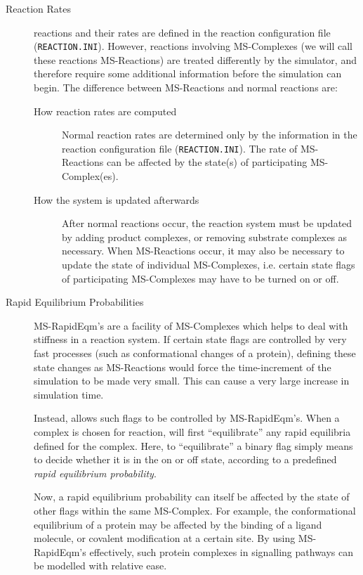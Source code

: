 \begin{description}
\item[Reaction Rates] \stochsim{} reactions and their rates are defined
  in the reaction configuration file (\texttt{REACTION.INI}).  However,
  reactions involving MS-Complexes (we will call these reactions
  MS-Reactions) are treated differently by the simulator, and
  therefore require some additional information before the simulation
  can begin.  The difference between MS-Reactions and normal \stochsim{}
  reactions are:
  \begin{description}
  \item[How reaction rates are computed] Normal \stochsim{} reaction
    rates are determined only by the information in the reaction
    configuration file (\texttt{REACTION.INI}).  The rate of MS-Reactions can
    be affected by the state(s) of participating MS-Complex(es).
    
  \item[How the system is updated afterwards] After normal \stochsim{}
    reactions occur, the reaction system must be updated by adding
    product complexes, or removing substrate complexes as necessary.
    When MS-Reactions occur, it may also be necessary to update the
    state of individual MS-Complexes, i.e. certain state flags of
    participating MS-Complexes may have to be turned on or off.

  \end{description}
  
\item[Rapid Equilibrium Probabilities] MS-RapidEqm's are a facility of
  MS-Complexes which helps to deal with stiffness in a reaction
  system.  If certain state flags are controlled by very fast
  processes (such as conformational changes of a protein), defining
  these state changes as MS-Reactions would force the time-increment
  of the simulation to be made very small.  This can cause a very
  large increase in simulation time.\par
  
  Instead, \stochsim{} allows such flags to be controlled by
  MS-RapidEqm's.  When a complex is chosen for reaction, \stochsim{} will
  first ``equilibrate'' any rapid equilibria defined for the complex.
  Here, to ``equilibrate'' a binary flag simply means to decide
  whether it is in the on or off state, according to a predefined
  \emph{rapid equilibrium probability}.\par
  
  Now, a rapid equilibrium probability can itself be affected by the
  state of other flags within the same MS-Complex.  For example, the
  conformational equilibrium of a protein may be affected by the
  binding of a ligand molecule, or covalent modification at a certain
  site.  By using MS-RapidEqm's effectively, such protein complexes in
  signalling pathways can be modelled with relative ease.

\end{description}


